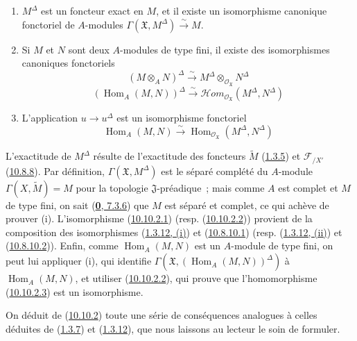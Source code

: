 \begin{proposition}[10.10.2]
\label{I.10.10.2-fr}
\medskip\noindent
\begin{enumerate}
  \item[\rm{(i)}] $M^\Delta$ est un foncteur exact en $M$, et il existe
    un isomorphisme canonique fonctoriel de $A$-modules
    $\Gamma(\mathfrak{X},M^\Delta)\xrightarrow{\sim}M$.
  \item[\rm{(ii)}] Si $M$ et $N$ sont deux $A$-modules de type fini, il
    existe des isomorphismes canoniques fonctoriels
    \[
      (M\otimes_A N)^\Delta
      \xrightarrow{\sim}
      M^\Delta\otimes_{\mathscr{O}_{\mathfrak{X}}}N^\Delta
      \tag{10.10.2.1}\label{I.10.10.2.1-fr}
    \]
    \[
      (\operatorname{Hom}_A(M,N))^\Delta
      \xrightarrow{\sim}
      \mathscr{H}\!om_{\mathscr{O}_{\mathfrak{X}}}
      (M^\Delta,N^\Delta)
      \tag{10.10.2.2}\label{I.10.10.2.2-fr}
    \]
  \item[\rm{(iii)}] L'application $u\to u^\Delta$ est un isomorphisme
    fonctoriel
    \[
      \operatorname{Hom}_A(M,N)
      \xrightarrow{\sim}
      \operatorname{Hom}_{\mathscr{O}_{\mathfrak{X}}}
      (M^\Delta,N^\Delta)
      \tag{10.10.2.3}\label{I.10.10.2.3-fr}
    \]
\end{enumerate}
\end{proposition}

L'exactitude de $M^\Delta$ résulte de l'exactitude des foncteurs
$\widetilde M$ (\hyperref[I.1.3.5-fr]{1.3.5}) et
$\mathscr{F}_{/X'}$ (\hyperref[I.10.8.8-fr]{10.8.8}). Par
définition, $\Gamma(\mathfrak{X},M^\Delta)$ est le séparé complété du
$A$-module $\Gamma(X,\widetilde M)=M$ pour la topologie
$\mathfrak{J}$-préadique~; mais comme $A$ est complet et $M$ de type
fini, on sait (\hyperref[0.7.3.6-fr]{\textbf{0}, 7.3.6}) que $M$ est séparé et
complet, ce qui achève de prouver (i). L'isomorphisme
(\hyperref[I.10.10.2.1-fr]{10.10.2.1}) (resp.
(\hyperref[I.10.10.2.2-fr]{10.10.2.2})) provient de la composition des
isomorphismes (\hyperref[I.1.3.12-fr]{1.3.12, (i)}) et
(\hyperref[I.10.8.10.1-fr]{10.8.10.1}) (resp.
(\hyperref[I.1.3.12-fr]{1.3.12, (ii)}) et
(\hyperref[I.10.8.10.2-fr]{10.8.10.2})). Enfin, comme
$\operatorname{Hom}_A(M,N)$ est un $A$-module de type fini, on peut lui
appliquer (i), qui identifie
$\Gamma(\mathfrak{X},(\operatorname{Hom}_A(M,N))^\Delta)$ à
$\operatorname{Hom}_A(M,N)$, et utiliser
(\hyperref[I.10.10.2.2-fr]{10.10.2.2}), qui prouve que
l'homomorphisme (\hyperref[I.10.10.2.3-fr]{10.10.2.3}) est un
isomorphisme.

On déduit de (\hyperref[I.10.10.2-fr]{10.10.2}) toute une série de
conséquences analogues à celles déduites de
(\hyperref[I.1.3.7-fr]{1.3.7}) et
(\hyperref[I.1.3.12-fr]{1.3.12}), que nous laissons au lecteur le soin
de formuler.

